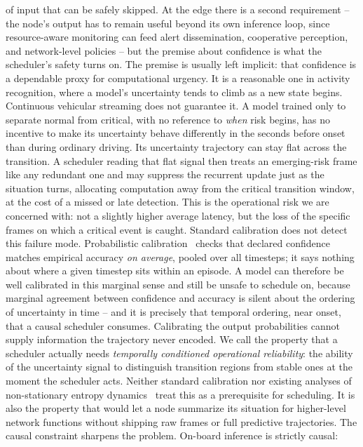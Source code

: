 \documentclass[a4paper,fleqn]{cas-dc}
\begin{document}
of input that can be safely skipped. At the edge there is a second requirement --
the node's output has to remain useful beyond its own inference loop, since
resource-aware monitoring can feed alert dissemination, cooperative perception, and
network-level policies -- but the premise about confidence is what the scheduler's
safety turns on.
The premise is usually left implicit: that confidence is a dependable proxy for
computational urgency. It is a reasonable one in activity recognition, where a
model's uncertainty tends to climb as a new state begins. Continuous vehicular
streaming does not guarantee it. A model trained only to separate normal from
critical, with no reference to \emph{when} risk begins, has no incentive to make its
uncertainty behave differently in the seconds before onset than during ordinary
driving. Its uncertainty trajectory can stay flat across the transition. A scheduler
reading that flat signal then treats an emerging-risk frame like any redundant one
and may suppress the recurrent update just as the situation turns, allocating computation away from the critical transition window, at the cost of a missed or late detection. This is the operational risk we are concerned with: not a slightly
higher average latency, but the loss of the specific frames on which a critical
event is caught.
Standard calibration does not detect this failure mode. Probabilistic
calibration~\cite{guo2017calibration} checks that declared confidence matches
empirical accuracy \emph{on average}, pooled over all timesteps; it says nothing
about where a given timestep sits within an episode. A model can therefore be
well calibrated in this marginal sense and still be unsafe to schedule on, because
marginal agreement between confidence and accuracy is silent about the ordering of
uncertainty in time -- and it is precisely that temporal ordering, near onset, that
a causal scheduler consumes. Calibrating the output probabilities cannot supply
information the trajectory never encoded.
We call the property that a scheduler actually needs \emph{temporally conditioned
operational reliability}: the ability of the uncertainty signal to distinguish
transition regions from stable ones at the moment the scheduler acts. Neither
standard calibration nor existing analyses of non-stationary entropy
dynamics~\cite{braverman2020calib,dera2023trust} treat this as a prerequisite for
scheduling. It is also the property that would let a node summarize its situation
for higher-level network functions without shipping raw frames or full predictive
trajectories.
The causal constraint sharpens the problem. On-board inference is strictly causal:
\end{document}
